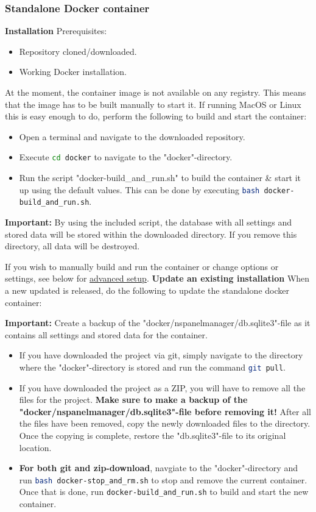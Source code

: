 \documentclass[10pt]{article}
\newcommand{\important}[1]{\begin{importantBox} \textbf{Important:} #1 \end{importantBox}}
\begin{document}
    \subsubsection{Standalone Docker container}
    \textbf{Installation}\newline
    Prerequisites:
    \begin{itemize}
      \item Repository cloned/downloaded.
      \item Working Docker installation.
    \end{itemize}
    At the moment, the container image is not available on any registry. This means that the image has to be built manually to start it. If running MacOS or Linux this is easy enough to do, perform the following to build and start the container:
    \begin{itemize}
      \item Open a terminal and navigate to the downloaded repository.
      \item Execute \lstinline[language=bash]|cd docker| to navigate to the "docker"-directory.
      \item Run the script "docker-build\_and\_run.sh" to build the container \& start it up using the default values. This can be done by executing \lstinline[language=bash]|bash docker-build_and_run.sh|.
    \end{itemize}
    \important{By using the included script, the database with all settings and stored data will be stored within the downloaded directory. If you remove this directory, all data will be destroyed.}
    If you wish to manually build and run the container or change options or settings, see below for \hyperref[sec:advanced_setup]{advanced setup}.
    \bigbreak
    \textbf{Update an existing installation}\newline
    When a new updated is released, do the following to update the standalone docker container:
    \important{Create a backup of the "docker/nspanelmanager/db.sqlite3"-file as it contains all settings and stored data for the container.}
    \begin{itemize}
      \item If you have downloaded the project via git, simply navigate to the directory where the "docker"-directory is stored and run the command \lstinline[language=bash]{git pull}.
      \item If you have downloaded the project as a ZIP, you will have to remove all the files for the project. \textbf{Make sure to make a backup of the "docker/nspanelmanager/db.sqlite3"-file before removing it!} After all the files have been removed, copy the newly downloaded files to the directory. Once the copying is complete, restore the "db.sqlite3"-file to its original location.
      \item \textbf{For both git and zip-download}, navgiate to the "docker"-directory and run \lstinline[language=bash]{bash docker-stop_and_rm.sh} to stop and remove the current container. Once that is done, run \lstinline[language=bash]{docker-build_and_run.sh} to build and start the new container.
    \end{itemize}
\end{document}
